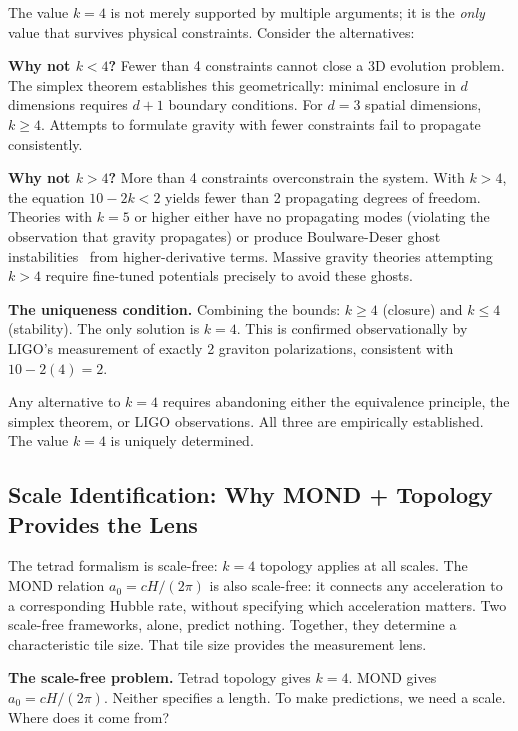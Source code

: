\documentclass[aps,prd,preprint,superscriptaddress,showpacs,preprintnumbers,amsmath,amssymb,nofootinbib]{revtex4-2}
\begin{document}
The value $k=4$ is not merely supported by multiple arguments; it is the \emph{only} value that survives physical constraints. Consider the alternatives:

\textbf{Why not $k < 4$?} Fewer than 4 constraints cannot close a 3D evolution problem. The simplex theorem establishes this geometrically: minimal enclosure in $d$ dimensions requires $d+1$ boundary conditions. For $d=3$ spatial dimensions, $k \geq 4$. Attempts to formulate gravity with fewer constraints fail to propagate consistently.

\textbf{Why not $k > 4$?} More than 4 constraints overconstrain the system. With $k > 4$, the equation $10 - 2k < 2$ yields fewer than 2 propagating degrees of freedom. Theories with $k = 5$ or higher either have no propagating modes (violating the observation that gravity propagates) or produce Boulware-Deser ghost instabilities~\cite{boulware1972} from higher-derivative terms. Massive gravity theories attempting $k > 4$ require fine-tuned potentials precisely to avoid these ghosts.

\textbf{The uniqueness condition.} Combining the bounds: $k \geq 4$ (closure) and $k \leq 4$ (stability). The only solution is $k = 4$. This is confirmed observationally by LIGO's measurement of exactly 2 graviton polarizations, consistent with $10 - 2(4) = 2$.

Any alternative to $k=4$ requires abandoning either the equivalence principle, the simplex theorem, or LIGO observations. All three are empirically established. The value $k=4$ is uniquely determined.

\subsection{Scale Identification: Why MOND + Topology Provides the Lens}
\label{subsec:scale-id}

The tetrad formalism is scale-free: $k=4$ topology applies at all scales. The MOND relation $a_0 = cH/(2\pi)$ is also scale-free: it connects any acceleration to a corresponding Hubble rate, without specifying which acceleration matters. Two scale-free frameworks, alone, predict nothing. Together, they determine a characteristic tile size. That tile size provides the measurement lens.

\textbf{The scale-free problem.} Tetrad topology gives $k=4$. MOND gives $a_0 = cH/(2\pi)$. Neither specifies a length. To make predictions, we need a scale. Where does it come from?
\end{document}
